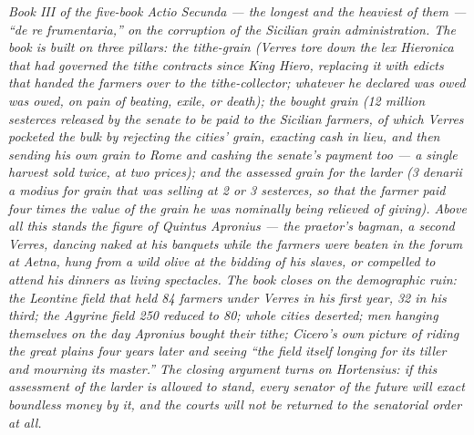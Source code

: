 
\textit{Book III of the five-book Actio Secunda --- the longest and the
heaviest of them --- ``de re frumentaria,'' on the corruption of the
Sicilian grain administration. The book is built on three pillars:
the tithe-grain (Verres tore down the lex Hieronica that had
governed the tithe contracts since King Hiero, replacing it with
edicts that handed the farmers over to the tithe-collector; whatever
he declared was owed was owed, on pain of beating, exile, or death);
the bought grain (12 million sesterces released by the senate to be
paid to the Sicilian farmers, of which Verres pocketed the bulk by
rejecting the cities' grain, exacting cash in lieu, and then sending
his own grain to Rome and cashing the senate's payment too --- a
single harvest sold twice, at two prices); and the assessed grain for
the larder (3 denarii a modius for grain that was selling at 2 or 3
sesterces, so that the farmer paid four times the value of the grain
he was nominally being relieved of giving). Above all this stands
the figure of Quintus Apronius --- the praetor's bagman, a second
Verres, dancing naked at his banquets while the farmers were beaten
in the forum at Aetna, hung from a wild olive at the bidding of his
slaves, or compelled to attend his dinners as living spectacles.
The book closes on the demographic ruin: the Leontine field that
held 84 farmers under Verres in his first year, 32 in his third;
the Agyrine field 250 reduced to 80; whole cities deserted; men
hanging themselves on the day Apronius bought their tithe; Cicero's
own picture of riding the great plains four years later and seeing
``the field itself longing for its tiller and mourning its master.''
The closing argument turns on Hortensius: if this assessment of the
larder is allowed to stand, every senator of the future will exact
boundless money by it, and the courts will not be returned to the
senatorial order at all.}
